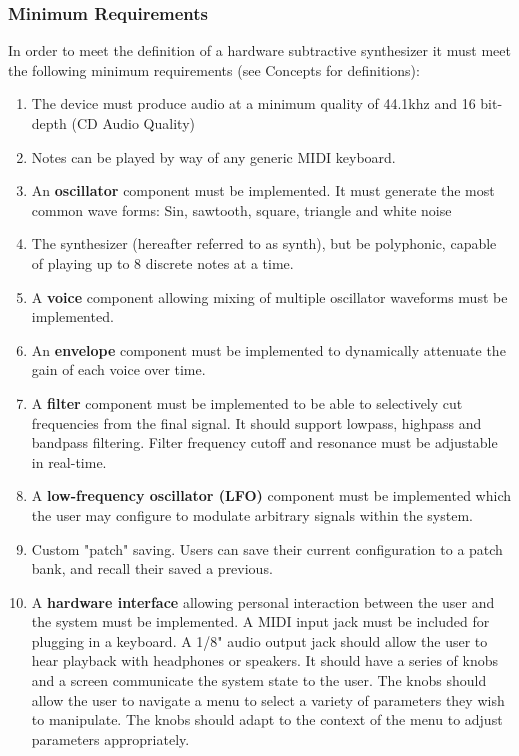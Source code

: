 \documentclass[acmlarge,screen]{acmart}
\begin{document}
	\subsubsection{Minimum Requirements}
	In order to meet the definition of a hardware subtractive synthesizer it must meet the following minimum requirements (see Concepts for definitions):
	\begin{enumerate}
		\item The device must produce audio at a minimum quality of 44.1khz and 16 bit-depth (CD Audio Quality)
		\item Notes can be played by way of any generic MIDI keyboard.
		\item An \textbf{oscillator} component must be implemented. It must generate the most common wave forms: Sin, sawtooth, square, triangle and white noise
		\item The synthesizer (hereafter referred to as synth), but be polyphonic, capable of playing up to 8 discrete notes at a time.
		\item A \textbf{voice} component allowing mixing of multiple oscillator waveforms must be implemented.
		\item An \textbf{envelope} component must be implemented to dynamically attenuate the gain of each voice over time.
		\item A \textbf{filter} component must be implemented to be able to selectively cut frequencies from the final signal. It should support lowpass, highpass and bandpass filtering. Filter frequency cutoff and resonance must be adjustable in real-time.
		\item A \textbf{low-frequency oscillator (LFO)} component must be implemented which the user may configure to modulate arbitrary signals within the system.
		\item Custom "patch" saving. Users can save their current configuration to a patch bank, and recall their saved a previous.
		\item A \textbf{hardware interface} allowing personal interaction between the user and the system must be implemented. A MIDI input jack must be included for plugging in a keyboard. A 1/8" audio output jack should allow the user to hear playback with headphones or speakers. It should have a series of knobs and a screen communicate the system state to the user. The knobs should allow the user to navigate a menu to select a variety of parameters they wish to manipulate. The knobs should adapt to the context of the menu to adjust parameters appropriately.
	\end{enumerate}
\end{document}
